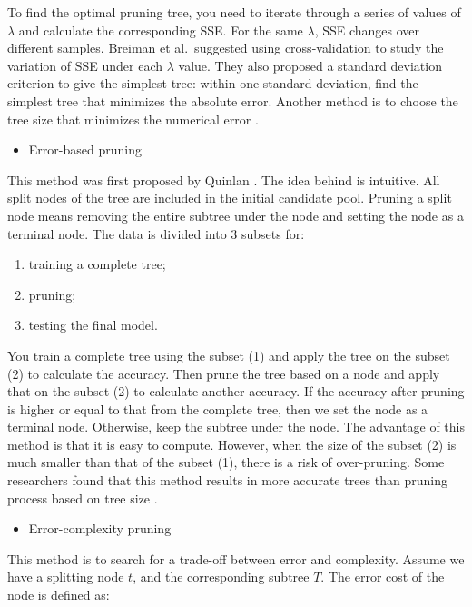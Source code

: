 \documentclass[12pt,]{krantz}
\providecommand{\tightlist}{%
  \setlength{\itemsep}{0pt}\setlength{\parskip}{0pt}}
\begin{document}
To find the optimal pruning tree, you need to iterate through a series of values of \(\lambda\) and calculate the corresponding SSE. For the same \(\lambda\), SSE changes over different samples. Breiman et al.~suggested using cross-validation \citep{Breiman1984} to study the variation of SSE under each \(\lambda\) value. They also proposed a standard deviation criterion to give the simplest tree: within one standard deviation, find the simplest tree that minimizes the absolute error. Another method is to choose the tree size that minimizes the numerical error \citep{Hastie2008}.

\begin{itemize}
\tightlist
\item
  Error-based pruning
\end{itemize}

This method was first proposed by Quinlan \citep{Quinlan1999}. The idea behind is intuitive. All split nodes of the tree are included in the initial candidate pool. Pruning a split node means removing the entire subtree under the node and setting the node as a terminal node. The data is divided into 3 subsets for:

\begin{enumerate}
\def\labelenumi{(\arabic{enumi})}
\item
  training a complete tree;
\item
  pruning;
\item
  testing the final model.
\end{enumerate}

You train a complete tree using the subset (1) and apply the tree on the subset (2) to calculate the accuracy. Then prune the tree based on a node and apply that on the subset (2) to calculate another accuracy. If the accuracy after pruning is higher or equal to that from the complete tree, then we set the node as a terminal node. Otherwise, keep the subtree under the node. The advantage of this method is that it is easy to compute. However, when the size of the subset (2) is much smaller than that of the subset (1), there is a risk of over-pruning. Some researchers found that this method results in more accurate trees than pruning process based on tree size \citep{Espoito1997}.

\begin{itemize}
\tightlist
\item
  Error-complexity pruning
\end{itemize}

This method is to search for a trade-off between error and complexity. Assume we have a splitting node \(t\), and the corresponding subtree \(T\). The error cost of the node is defined as:
\end{document}
